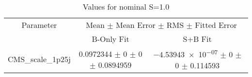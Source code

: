 \begin{table}
\centering
\caption{Values for nominal S=1.0}
\begin{tabular}{ccc}
\toprule
Parameter 	& \multicolumn{2}{c}{Mean $\pm$ Mean Error $\pm$ RMS $\pm$ Fitted Error}\\
 	& B-Only Fit & S+B Fit\\
\midrule
CMS\_scale\_1p25j 	& \num{0.0972344} $\pm$ \num{0} $\pm$ \num{0} $\pm$ \num{0.0894959} 	& \num{-4.53943e-07} $\pm$ \num{0} $\pm$ \num{0} $\pm$ \num{0.114593}\\
\bottomrule
\end{tabular}
\end{table}